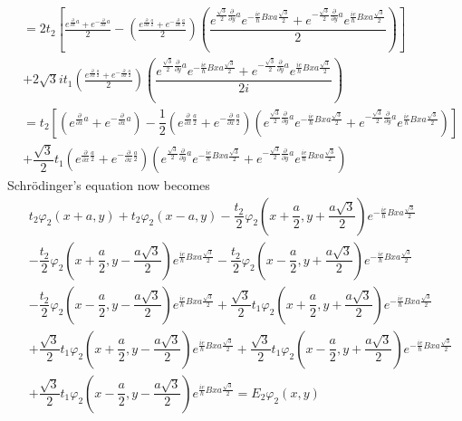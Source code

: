 \documentclass{report}
\newcommand{\f}[2]{\dfrac{#1}{#2}}
\begin{document}
\begin{align*}
	 & = 2t_{2} \left[ \frac{e^{\frac{\partial}{\partial x}a} + e^{-\frac{\partial}{\partial x}a}}{2} - \left(\frac{e^{\frac{\partial}{\partial x}\frac{a}{2}} + e^{-\frac{\partial}{\partial x}\frac{a}{2}}}{2}\right) \left( \f{e^{\frac{\sqrt{3}}{2}\frac{\partial}{\partial y}a } e^{-\frac{ie}{\hbar} Bxa\frac{\sqrt{3}}{2}} + e^{-\frac{\sqrt{3}}{2}\frac{\partial}{\partial y}a } e^{\frac{ie}{\hbar} Bxa\frac{\sqrt{3}}{2}}}{2} \right) \right] \\
	 & + 2\sqrt{3} i t_{1} \left(\frac{e^{\frac{\partial}{\partial x}\frac{a}{2}} + e^{-\frac{\partial}{\partial x}\frac{a}{2}}}{2}\right) \left( \f{e^{\frac{\sqrt{3}}{2}\frac{\partial}{\partial y}a } e^{-\frac{ie}{\hbar} Bxa\frac{\sqrt{3}}{2}} + e^{-\frac{\sqrt{3}}{2}\frac{\partial}{\partial y}a } e^{\frac{ie}{\hbar} Bxa\frac{\sqrt{3}}{2}}}{2i} \right)                                                                                     \\
	 & = t_{2} \left[ \left(e^{\frac{\partial}{\partial x}a} + e^{-\frac{\partial}{\partial x}a}\right) - \f{1}{2}\left(e^{\frac{\partial}{\partial x}\frac{a}{2}} + e^{-\frac{\partial}{\partial x}\frac{a}{2}}\right) \left(e^{\frac{\sqrt{3}}{2}\frac{\partial}{\partial y}a } e^{-\frac{ie}{\hbar} Bxa\frac{\sqrt{3}}{2}} + e^{-\frac{\sqrt{3}}{2}\frac{\partial}{\partial y}a } e^{\frac{ie}{\hbar} Bxa\frac{\sqrt{3}}{2}}\right)\right]           \\
	 & + \f{\sqrt{3}}{2} t_{1} \left(e^{\frac{\partial}{\partial x}\frac{a}{2}} + e^{-\frac{\partial}{\partial x}\frac{a}{2}}\right) \left(e^{\frac{\sqrt{3}}{2}\frac{\partial}{\partial y}a } e^{-\frac{ie}{\hbar} Bxa\frac{\sqrt{3}}{2}} + e^{-\frac{\sqrt{3}}{2}\frac{\partial}{\partial y}a } e^{\frac{ie}{\hbar} Bxa\frac{\sqrt{3}}{2}}\right)
\end{align*}
Schr\"{o}dinger's equation now becomes
\begin{align*}
	 & t_{2} \varphi_{2}(x+a,y) + t_{2} \varphi_{2}(x-a,y) - \f{t_{2}}{2}\varphi_{2}(x + \f{a}{2},y + \f{a\sqrt{3}}{2}) e^{-\frac{ie}{\hbar} Bxa\frac{\sqrt{3}}{2}}                                                                       \\
	 & - \f{t_{2}}{2}\varphi_{2}(x + \f{a}{2},y - \f{a\sqrt{3}}{2}) e^{\frac{ie}{\hbar} Bxa\frac{\sqrt{3}}{2}} - \f{t_{2}}{2}\varphi_{2}(x - \f{a}{2},y + \f{a\sqrt{3}}{2}) e^{-\frac{ie}{\hbar} Bxa\frac{\sqrt{3}}{2}}                   \\
	 & - \f{t_{2}}{2}\varphi_{2}(x - \f{a}{2},y - \f{a\sqrt{3}}{2}) e^{\frac{ie}{\hbar} Bxa\frac{\sqrt{3}}{2}} + \f{\sqrt{3}}{2} t_{1}\varphi_{2}(x + \f{a}{2},y + \f{a\sqrt{3}}{2}) e^{-\frac{ie}{\hbar} Bxa\frac{\sqrt{3}}{2}}          \\
	 & + \f{\sqrt{3}}{2} t_{1}\varphi_{2}(x + \f{a}{2},y - \f{a\sqrt{3}}{2}) e^{\frac{ie}{\hbar} Bxa\frac{\sqrt{3}}{2}} + \f{\sqrt{3}}{2} t_{1}\varphi_{2}(x - \f{a}{2},y + \f{a\sqrt{3}}{2}) e^{-\frac{ie}{\hbar} Bxa\frac{\sqrt{3}}{2}} \\
	 & + \f{\sqrt{3}}{2} t_{1}\varphi_{2}(x - \f{a}{2},y - \f{a\sqrt{3}}{2}) e^{\frac{ie}{\hbar} Bxa\frac{\sqrt{3}}{2}} = E_{2}\varphi_{2}(x,y) \tag{8}
\end{align*}
\end{document}
